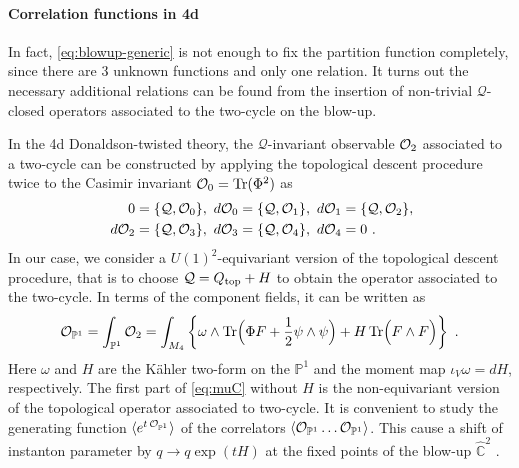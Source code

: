 \documentclass[letterpaper, 11pt]{article}
\def\IC{\mathbb{C}}
\def\IP{\mathbb{P}}
\def\CO{{\cal O}}
\def\CQ{{\cal Q}}
\def\half{\frac{1}{2}}
\begin{document}
\paragraph{Correlation functions in 4d}

In fact, \eqref{eq:blowup-generic} is not enough to fix the partition function completely,  since there are 3 unknown functions and only one relation. It turns out the necessary additional relations can be found from the insertion of non-trivial $\mathcal{Q}$-closed operators \cite{Nakajima:2003pg,Nakajima:2005fg} associated to the two-cycle on the blow-up. 

In the 4d Donaldson-twisted theory, the $\mathcal{Q}$-invariant observable $\CO_2$ associated to a two-cycle can be constructed by applying the topological descent procedure twice to the Casimir invariant $\CO_0 = \text{Tr}(\Phi^2)$ as \cite{Witten:1988ze}
\begin{align}
\begin{split}
0 &= \{ \CQ, \CO_0 \}, 
~ d\CO_0 = \{\CQ, \CO_1 \}, 
~ d\CO_1 = \{\CQ, \CO_2 \}, \\
~ d\CO_2 &= \{\CQ, \CO_3 \}, 
~ d\CO_3 = \{\CQ, \CO_4 \}, 
~ d\CO_4 = 0 \ . 
\end{split}
\end{align} 
In our case, we consider a $U(1)^2$-equivariant version of the topological descent procedure, that is to choose $\CQ = Q_{\textrm{top}} + H$ to obtain the operator associated to the two-cycle. In terms of the component fields, it can be written as \cite{Bershtein:2015xfa}
\begin{align} \label{eq:muC}
  {\CO}_{\IP^1} = \int_{\IP^1} \CO_2 = \int_{M_4} \left\{ \omega \wedge \text{Tr}\Big(\Phi F + \half \psi \wedge \psi\Big) + H\, \text{Tr}\Big( F \wedge F \Big) \right\}  \ .
\end{align} 
Here $\omega$ and $H$ are the K\"ahler two-form on the $\IP^1$ and the moment map $\iota_V \omega = dH$, respectively. The first part of \eqref{eq:muC} without $H$ is the non-equivariant version of the topological operator associated to two-cycle. 
It is convenient to study the generating function $\langle e^{t \, {\CO}_{\IP^1}}\rangle $ of the correlators $\langle {\CO}_{\IP^1} \ldots {\CO}_{\IP^1} \rangle$. 
This cause a shift of instanton parameter by $q \to q \exp(t H)$ at the fixed points of the blow-up $\hat{\IC}^2$ \cite{Nakajima:2003pg,Nakajima:2003uh, Nakajima:2005fg}.  
\end{document}

